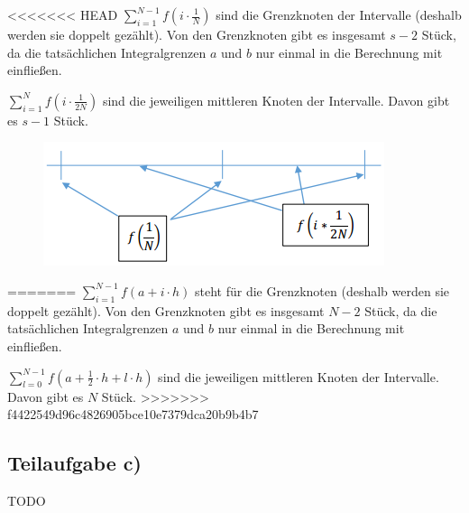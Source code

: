 <<<<<<< HEAD
$\sum_{i=1}^{N-1} f(i \cdot \frac{1}{N})$  sind die Grenzknoten der Intervalle
 (deshalb werden sie doppelt gezählt). Von den Grenzknoten gibt es
insgesamt $s-2$ Stück, da die tatsächlichen Integralgrenzen $a$ und $b$
nur einmal in die Berechnung mit einfließen.

$\sum_{i=1}^N f(i \cdot \frac{1}{2N})$ sind die jeweiligen
mittleren Knoten der Intervalle. Davon gibt es $s-1$ Stück.

\begin{figure}[h]
    \centering
    \includegraphics*[width=\linewidth, keepaspectratio]{aufgabe4-b.png}
\end{figure}
=======
$\sum_{i=1}^{N-1} f(a + i \cdot h)$ steht für die Grenzknoten
 (deshalb werden sie doppelt gezählt). Von den Grenzknoten gibt es 
insgesamt $N-2$ Stück, da die tatsächlichen Integralgrenzen $a$ und $b$ 
nur einmal in die Berechnung mit einfließen.

$\sum_{l=0}^{N-1} f(a + \frac{1}{2} \cdot h + l \cdot h)$ sind die jeweiligen 
mittleren Knoten der Intervalle. Davon gibt es $N$ Stück.
>>>>>>> f4422549d96c4826905bce10e7379dca20b9b4b7

\subsection*{Teilaufgabe c)}
TODO
